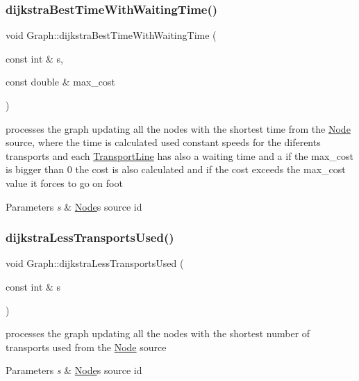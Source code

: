 \subsubsection{\texorpdfstring{dijkstra\+Best\+Time\+With\+Waiting\+Time()}{dijkstraBestTimeWithWaitingTime()}}
{\footnotesize\ttfamily void Graph\+::dijkstra\+Best\+Time\+With\+Waiting\+Time (\begin{DoxyParamCaption}\item[{const int \&}]{s,  }\item[{const double \&}]{max\+\_\+cost }\end{DoxyParamCaption})}



processes the graph updating all the nodes with the shortest time from the \hyperlink{class_node}{Node} source, where the time is calculated used constant speeds for the diferents transports and each \hyperlink{class_transport_line}{Transport\+Line} has also a waiting time and a if the max\+\_\+cost is bigger than 0 the cost is also calculated and if the cost exceeds the max\+\_\+cost value it forces to go on foot 


\begin{DoxyParams}{Parameters}
{\em s} & \hyperlink{class_node}{Node}\textquotesingle{}s source id \\
\hline
\end{DoxyParams}
\mbox{\label{class_graph_a747e004c927e230f380d58a399ce9e72}} 
\subsubsection{\texorpdfstring{dijkstra\+Less\+Transports\+Used()}{dijkstraLessTransportsUsed()}}
{\footnotesize\ttfamily void Graph\+::dijkstra\+Less\+Transports\+Used (\begin{DoxyParamCaption}\item[{const int \&}]{s }\end{DoxyParamCaption})}



processes the graph updating all the nodes with the shortest number of transports used from the \hyperlink{class_node}{Node} source 


\begin{DoxyParams}{Parameters}
{\em s} & \hyperlink{class_node}{Node}\textquotesingle{}s source id \\
\hline
\end{DoxyParams}
\mbox{\label{class_graph_ab8c22a8531c0fccd1e7e555ece7b388d}} 
